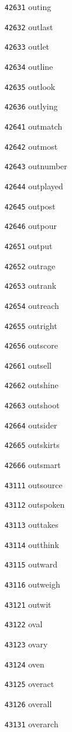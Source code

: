 \documentclass[twoside,11pt]{article}
\begin{document}
\begin{multicols}{5}
\begin{enumerate}
\item[\texttt{42631}] outing
\item[\texttt{42632}] outlast
\item[\texttt{42633}] outlet
\item[\texttt{42634}] outline
\item[\texttt{42635}] outlook
\item[\texttt{42636}] outlying
\item[\texttt{42641}] outmatch
\item[\texttt{42642}] outmost
\item[\texttt{42643}] outnumber
\item[\texttt{42644}] outplayed
\item[\texttt{42645}] outpost
\item[\texttt{42646}] outpour
\item[\texttt{42651}] output
\item[\texttt{42652}] outrage
\item[\texttt{42653}] outrank
\item[\texttt{42654}] outreach
\item[\texttt{42655}] outright
\item[\texttt{42656}] outscore
\item[\texttt{42661}] outsell
\item[\texttt{42662}] outshine
\item[\texttt{42663}] outshoot
\item[\texttt{42664}] outsider
\item[\texttt{42665}] outskirts
\item[\texttt{42666}] outsmart
\item[\texttt{43111}] outsource
\item[\texttt{43112}] outspoken
\item[\texttt{43113}] outtakes
\item[\texttt{43114}] outthink
\item[\texttt{43115}] outward
\item[\texttt{43116}] outweigh
\item[\texttt{43121}] outwit
\item[\texttt{43122}] oval
\item[\texttt{43123}] ovary
\item[\texttt{43124}] oven
\item[\texttt{43125}] overact
\item[\texttt{43126}] overall
\item[\texttt{43131}] overarch

\end{enumerate}
\end{multicols}
\end{document}
